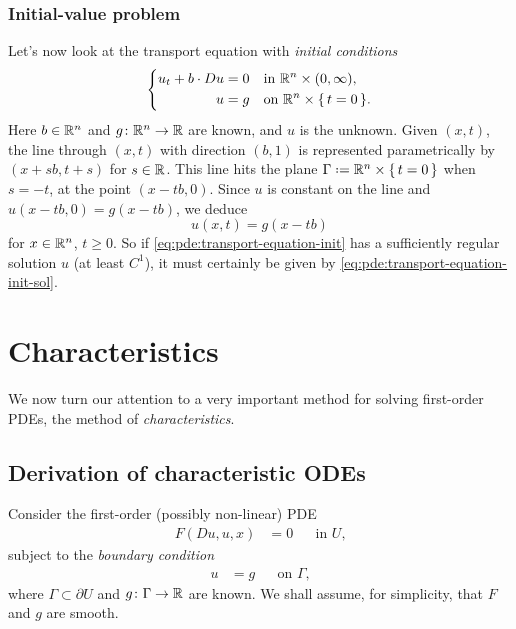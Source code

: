\subsubsection{Initial-value problem}
Let's now look at the transport equation with \emph{initial conditions}
\begin{equation}
  \label{eq:pde:transport-equation-init}
  \left\{
    \begin{aligned}
      u_t+b\cdot Du&=0&&\text{in \(\mathbb{R}^n\times(0,\infty)\),}\\
      u&=g&&\text{on \(\mathbb{R}^n\times\{\,t=0\,\}\).}
    \end{aligned}
  \right.
\end{equation}
Here \(b\in\mathbb{R}^n\) and \(g\colon\mathbb{R}^n\to\mathbb{R}\) are known, and \(u\) is
the unknown. Given \((x,t)\), the line through \((x,t)\) with direction
\((b,1)\) is represented parametrically by \((x+sb,t+s)\) for
\(s\in\mathbb{R}\). This line hits the plane
\(\Gamma\defeq\bbR^n\times\{\,t=0\,\}\) when \(s=-t\), at the point
\((x-tb,0)\). Since \(u\) is constant on the line and
\(u(x-tb,0)=g(x-tb)\), we deduce
\begin{equation}
  \label{eq:pde:transport-equation-init-sol}
  u(x,t)=g(x-tb)
\end{equation}
for \(x\in\mathbb{R}^n\), \(t\geq 0\). So if
\eqref{eq:pde:transport-equation-init} has a sufficiently regular solution
\(u\) (at least \(C^1\)), it must certainly be given by
\eqref{eq:pde:transport-equation-init-sol}.

\section{Characteristics}
We now turn our attention to a very important method for solving
first-order PDEs, the method of \emph{characteristics}.
\subsection{Derivation of characteristic ODEs}
Consider the first-order (possibly non-linear) PDE
\begin{equation}
  \label{eq:pde:first-order}
  \begin{aligned}
    F(Du,u,x)&=0&&\text{in \(U\),}
  \end{aligned}
\end{equation}
subject to the \emph{boundary condition}
\begin{equation}
  \label{eq:pde:boundary-condition}
  \begin{aligned}
    u&=g&&\text{on \(\Gamma\),}
  \end{aligned}
\end{equation}
where \(\Gamma\subset\partial U\) and \(g\colon\Gamma\to\mathbb{R}\) are
known. We shall assume, for simplicity, that \(F\) and \(g\) are smooth.

